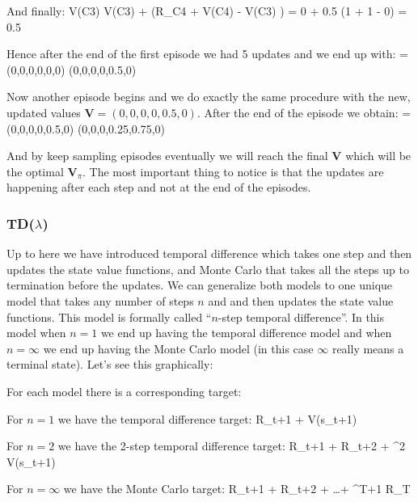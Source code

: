 And finally:
\bse
V(C3) \gets V(C3) + \alpha \left(R_{C4} + \gamma V(C4) - V(C3) \right) =
0 + 0.5 \cdot \left(1 + 1  - 0\right) = 0.5
\ese

Hence after the end of the first episode we had 5 updates and we end up with:
\bse
{} = (0,0,0,0,0,0) \to (0,0,0,0,0.5,0)
\ese

Now another episode begins and we do exactly the same procedure with the new, updated values $\boldsymbol{V} = (0,0,
0,0,0.5,0)$. After the end of the episode we obtain:
\bse
{} = (0,0,0,0,0.5,0) \to (0,0,0,0.25,0.75,0)
\ese

And by keep sampling episodes eventually we will reach the final $\boldsymbol{V}$ which will be the optimal
$\boldsymbol{V}_{\pi}$. The most important thing to notice is that the updates are happening after each step and not
at the end of the episodes.

\subsubsection{TD($\lambda$)}

Up to here we have introduced temporal difference which takes one step and then updates the state value functions,
and Monte Carlo that takes all the steps up to termination before the updates. We can generalize both models to one
unique model that takes any number of steps $n$ and and then updates the state value functions. This model is
formally called ``$n$-step temporal difference''. In this model when $n=1$ we end up having the temporal difference
model and when $n=\infty$ we end up having the Monte Carlo model (in this case $\infty$ really means a terminal
state). Let's see this graphically:


\vspace{-15pt}

For each model there is a corresponding target:
\bit
\item For $n=1$ we have the temporal difference target:
\bse
R_{t+1} + \gamma V(s_{t+1})
\ese

\item For $n=2$ we have the 2-step temporal difference target:
\bse
R_{t+1} + \gamma R_{t+2} + \gamma^2 V(s_{t+1})
\ese

\item For $n=\infty$ we have the Monte Carlo target:
\bse
R_{t+1} + \gamma R_{t+2} + \ldots + \gamma^{T+1} R_T
\ese
\eit


